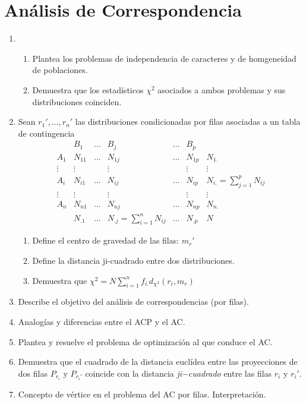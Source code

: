 \documentclass[twoside]{article}
\begin{document}
\section{Análisis de Correspondencia}
\begin{enumerate}
\item 
\begin{enumerate}
\item Plantea los problemas de independencia de caracteres y de homgeneidad de poblaciones.
\item Demuestra que los estadísticos $\chi^2$ asociados a ambos problemas y sus distribuciones coinciden.
\end{enumerate}
\item Sean $r_1', \dots, r_n'$ las distribuciones condicionadas por filas asociadas a un tabla de contingencia
\[\begin{matrix}
    & B_1    & \dots & B_j    & \dots & B_p\\
A_1 & N_{11} & \dots & N_{1j} & \dots & N_{1p} & N_{1.}\\
\vdots & \vdots & & \vdots & & \vdots & \vdots\\
A_i & N_{i1} & \dots & N_{ij} & \dots & N_{ip} & N_{i.} = \sum_{j=1}^p N_{ij}\\
\vdots & \vdots & & \vdots & & \vdots & \vdots\\
A_n & N_{n1} & \dots & N_{nj} & \dots & N_{np} & N_{n.}\\
    & N_{.1} & \dots & N_{.j} = \sum_{i=1}^n N_{ij} & \dots & N_{.p} & N
\end{matrix}\]
\begin{enumerate}
	\item Define el centro de gravedad de las filas: $m_r'$
	\item Define la distancia ji-cuadrado entre dos distribuciones. 
	\item Demuestra que $\chi^2 = N\sum_{i=1}^n f_{i.} d_{\chi^2} (r_i, m_r)$
\end{enumerate}
\item Describe el objetivo del análisis de correspondencias (por filas).
\item Analogías y diferencias entre el ACP y el AC.
\item Plantea y resuelve el problema de optimización al que conduce el AC. 
\item Demuestra que el cuadrado de la distancia euclídea entre las proyecciones de dos filas $P_{r_i}$ y $P_{r_i'}$ coincide con la distancia \emph{ji−cuadrado} entre las filas $r_i$ y $r_i'$.
\item Concepto de vértice en el problema del AC por filas. Interpretación. 

\end{enumerate}
\end{document}

